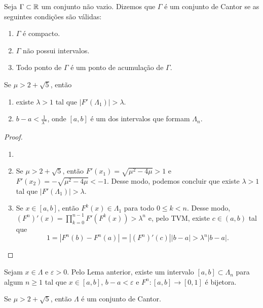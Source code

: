\begin{definition}
Seja $\Gamma \subset \mathbb{R}$ um conjunto não vazio. Dizemos que $\Gamma$ é um conjunto de Cantor se as seguintes condições são válidas:
\begin{enumerate}[label=\roman*.]
\item $\Gamma$ é compacto.
\item $\Gamma$ não possui intervalos.
\item Todo ponto de $\Gamma$ é um ponto de acumulação de $\Gamma$.
\end{enumerate}
\end{definition}

\begin{lemma} \label{lema conjuntosdecantor 1}
Se $\mu > 2 + \sqrt{5}$, então
\begin{enumerate}
\item  existe $\lambda > 1$ tal que $|F'(\Lambda_1)| > \lambda$.

\item $b - a < \frac{1}{\lambda^n}$, onde $[a, b]$ é um dos intervalos que formam $\Lambda_n$.
\end{enumerate}
\end{lemma}

\begin{proof}
\begin{enumerate}\item[]
\item Se $\mu > 2 + \sqrt{5}$, então $F'(x_1) = \sqrt{\mu^2 - 4\mu} > 1$ e $F'(x_2) = -\sqrt{\mu^2 - 4\mu} < -1$.
Desse modo, podemos concluir que existe $\lambda > 1$ tal que $|F'(\Lambda_1)| > \lambda$.

\item Se $x \in [a, b]$, então $F^k(x) \in \Lambda_1$ para todo $0 \leq k < n$.
Desse modo, $(F^n)'(x) = \prod_{k=0}^{n-1} F'(F^k(x)) > \lambda^n$ e, pelo TVM, existe $c \in (a, b)$ tal que
$$1 = |F^n(b) - F^n(a)| = |(F^n)'(c)||b - a| > \lambda^n|b - a|.$$
\end{enumerate}
\end{proof} 

Sejam $x \in \Lambda$ e $\varepsilon > 0$. Pelo Lema anterior,  existe um intervalo $[a, b] \subset \Lambda_n$ para algum $n \geq 1$ tal que $x \in [a, b]$, $b - a < \varepsilon$ e $F^n: [a, b] \to [0,1]$ é bijetora.

\begin{theorem} \label{teorema conjuntosdecantor 1}
Se $\mu > 2 + \sqrt{5}$, então $\Lambda$ é um conjunto de Cantor.
\end{theorem}


